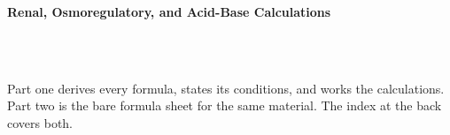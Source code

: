 



\makeindex[title={Index of This Volume},columns=2,intoc]

\begin{titlepage}\thispagestyle{empty}
\vspace*{0.14\textheight}
\noindent{\color{tiercore}\rule{\textwidth}{5pt}}\\[3pt]
\noindent{\color{bioline}\rule{\textwidth}{1pt}}\\[26pt]
\\[12pt]
\noindent\begin{minipage}{\textwidth}\raggedright
{\sffamily\bfseries\fontsize{28}{32}\selectfont\color{bioink}%
 \hyphenchar{} Renal, Osmoregulatory, and Acid-Base Calculations\par}\end{minipage}\\[16pt]
\noindent{\color{biogreen}\rule{\textwidth}{1.4pt}}\\[10pt]
\noindent\begin{minipage}{\textwidth}\raggedright
{\fontsize{10.5}{14}\selectfont\color{biogreen}%
Part one derives every formula, states its conditions, and works the calculations. Part two is the
bare formula sheet for the same material. The index at the back covers both.\par}\end{minipage}
\vfill
\noindent{\color{bioline}\rule{\textwidth}{1pt}}\\[3pt]
\noindent{\color{tiercore}\rule{\textwidth}{5pt}}
\end{titlepage}
\tableofcontents
\clearpage
{}
\clearpage
\printindex

